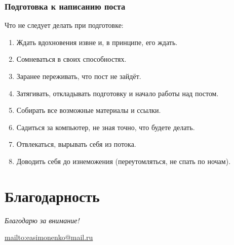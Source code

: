 \documentclass[12pt]{beamer}
\begin{document}
\begin{frame}
  \frametitle{Подготовка к написанию поста}
  Что не следует делать при подготовке:
  \begin{enumerate}
  \item Ждать вдохновения извне и, в принципе, его ждать.
  \item Сомневаться в своих способностях.
  \item Заранее переживать, что пост не зайдёт.
  \item Затягивать, откладывать подготовку и начало работы над постом.
  \item Собирать все возможные материалы и ссылки.
  \item Садиться за компьютер, не зная точно, что будете делать.
  \item Отвлекаться, вырывать себя из потока.
  \item Доводить себя до изнеможения (переутомляться, не спать по ночам).
  \end{enumerate}
\end{frame}

\section*{Благодарность}

\begin{frame}
  \center
  \textit{Благодарю за внимание!}

  \textbf{\textsl{\inserttitle}}

  \insertauthor

  \url{mailto:easimonenko@mail.ru}

  \insertinstitute
\end{frame}
\end{document}
